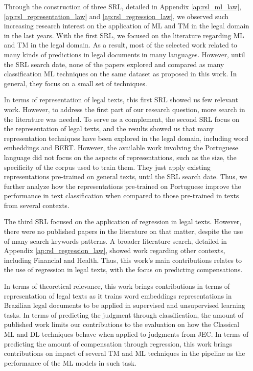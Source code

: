 Through the construction of three \gls{SRL}, detailed in Appendix \ref{ap:rsl_ml_law}, \ref{ap:rsl_representation_law} and \ref{ap:rsl_regression_law}, we observed such increasing research interest on the application of \gls{ML} and \gls{TM} in the legal domain in the last years. With the first \gls{SRL}, we focused on the literature regarding \gls{ML} and \gls{TM} in the legal domain. As a result, most of the selected work related to many kinds of predictions in legal documents in many languages. However, until the \gls{SRL} search date, none of the papers explored and compared as many classification \gls{ML} techniques on the same dataset as proposed in this work. In general, they focus on a small set of techniques.


In terms of representation of legal texts, this first \gls{SRL} showed us few relevant work. However,  to address the first part of our research question, more  search in the literature  was needed. To serve as a complement, the second \gls{SRL} focus on the representation of legal texts, and the results showed us that many representation techniques have been explored in the legal domain, including word embeddings and \gls{BERT}. However, the available work involving  the Portuguese language did not focus on the aspects of representations, such as the size, the specificity of the corpus used to train them.  They just apply existing  representations pre-trained on general texts, until the \gls{SRL} search date. Thus, we further analyze how the representations pre-trained on Portuguese improve the performance in text classification when compared to those pre-trained in texts from several contexts.

The third \gls{SRL} focused on the application of regression in legal texts. However, there were no published papers in the literature on that matter, despite the use of many search keywords patterns. A broader literature search, detailed in Appendix \ref{ap:rsl_regression_law}, showed work regarding other contexts, including Financial and Health. Thus, this work's main contributions relates to the use of regression in legal texts, with the focus on predicting compensations.

In terms of theoretical relevance, this work brings  contributions in terms of representation of legal texts as it trains word embeddings representations in Brazilian legal documents to be applied in supervised and unsupervised learning tasks. In terms of predicting the judgment through classification, the  amount of published work limits our contributions to the evaluation on how the Classical \gls{ML} and \gls{DL} techniques behave when applied to judgments from \gls{JEC}. In terms of predicting the amount of compensation through regression, this work brings contributions on impact of several \gls{TM} and \gls{ML} techniques in the pipeline as the performance of the \gls{ML} models in such task.

